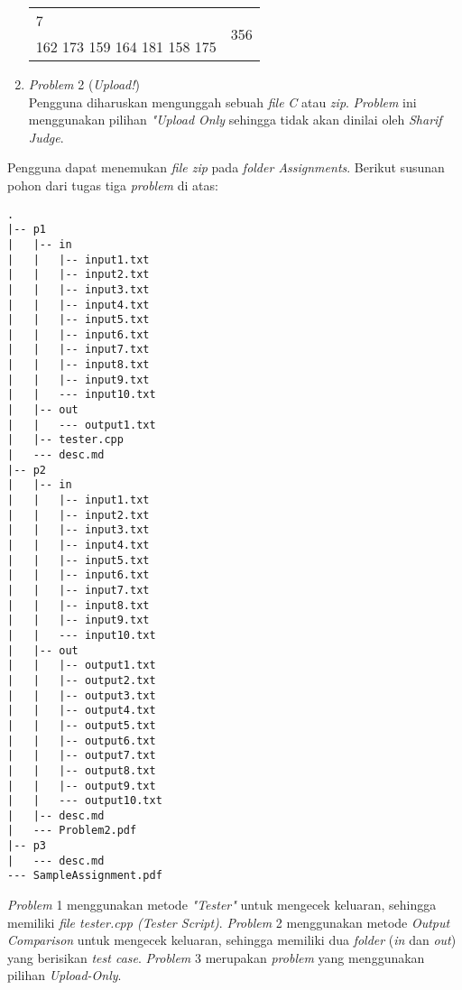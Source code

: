 \begin{enumerate}
\begin{table}[H]
\begin{tabular}{|c|c|}
			\hline
			\multicolumn{1}{|l|}{7} & \multirow{2}{*}{356}\\
			\multicolumn{1}{|l|}{162 173 159 164 181 158 175} & \\
			
			\hline
			
		\end{tabular} 
	\end{table}
	
	\item \textit{Problem} 2 (\textit{Upload!}) \\
	Pengguna diharuskan mengunggah sebuah \textit{file} \textit{C} atau \textit{zip}. \textit{Problem} ini menggunakan pilihan \textit{"Upload Only} sehingga tidak akan dinilai oleh \textit{Sharif Judge}.
\end{enumerate}

Pengguna dapat menemukan \textit{file zip} pada \textit{folder Assignments}. Berikut susunan pohon dari tugas tiga \textit{problem} di atas:
\begin{lstlisting}[basicstyle=\ttfamily, frame=single,
columns=fullflexible, keepspaces=true, breaklines=true]
.
|-- p1
|   |-- in
|   |   |-- input1.txt
|   |   |-- input2.txt
|   |   |-- input3.txt
|   |   |-- input4.txt
|   |   |-- input5.txt
|   |   |-- input6.txt
|   |   |-- input7.txt
|   |   |-- input8.txt
|   |   |-- input9.txt
|   |   --- input10.txt
|   |-- out
|   |   --- output1.txt
|   |-- tester.cpp
|   --- desc.md
|-- p2
|   |-- in
|   |   |-- input1.txt
|   |   |-- input2.txt
|   |   |-- input3.txt
|   |   |-- input4.txt
|   |   |-- input5.txt
|   |   |-- input6.txt
|   |   |-- input7.txt
|   |   |-- input8.txt
|   |   |-- input9.txt
|   |   --- input10.txt
|   |-- out
|   |   |-- output1.txt
|   |   |-- output2.txt
|   |   |-- output3.txt
|   |   |-- output4.txt
|   |   |-- output5.txt
|   |   |-- output6.txt
|   |   |-- output7.txt
|   |   |-- output8.txt
|   |   |-- output9.txt
|   |   --- output10.txt
|   |-- desc.md
|   --- Problem2.pdf
|-- p3
|   --- desc.md
--- SampleAssignment.pdf
\end{lstlisting}
\textit{Problem} 1 menggunakan metode \textit{"Tester"} untuk mengecek keluaran, sehingga memiliki \textit{file tester.cpp (Tester Script)}. \textit{Problem} 2 menggunakan metode \textit{Output Comparison} untuk mengecek keluaran, sehingga memiliki dua \textit{folder} (\textit{in} dan \textit{out}) yang berisikan \textit{test case}. \textit{Problem} 3 merupakan \textit{problem} yang menggunakan pilihan \textit{Upload-Only}.

